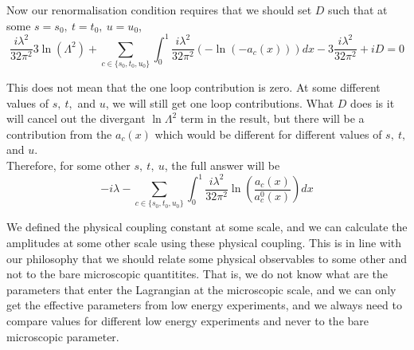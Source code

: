 \documentclass[11pt, notitlepage]{report}
\numberwithin{equation}{section}
\begin{document}
Now our renormalisation condition requires that we should set \(D\) such that at some \(s=s_0,~t=t_0,~u=u_0\), 
\begin{equation*}
    \frac{i\lambda^2 }{32\pi^2} 3\ln(\Lambda^2) +  \sum_{c\in\{s_0,t_0,u_0\}} \int_0^1  \frac{i\lambda^2 }{32\pi^2} \left( - \ln (-a_c(x)) \right)dx -  3\frac{i\lambda^2 }{32\pi^2} + iD = 0
\end{equation*}

This does not mean that the one loop contribution is zero. At some different values of \(s,~t,\) and \(u\), we will still get one loop contributions. What \(D\) does is it will cancel out the divergant \(\ln\Lambda^2\) term in the result, but there will be a contribution from the \(a_c(x)\) which would be different for different values of \(s,~t,\) and \(u\).\\

Therefore, for some other \(s,~t,~u\), the full answer will be 
\begin{equation*}
    -i\lambda - \sum_{c\in\{s_0,t_0,u_0\}} \int_0^1  \frac{i\lambda^2 }{32\pi^2}  \ln \left(\frac{a_c(x)}{a_c^0(x)} \right)dx
\end{equation*}

We defined the physical coupling constant at some scale, and we can calculate the amplitudes at some other scale using these physical coupling. This is in line with our philosophy that we should relate some physical observables to some other and not to the bare microscopic quantitites. That is, we do not know what are the parameters that enter the Lagrangian at the microscopic scale, and we can only get the effective parameters from low energy experiments, and we always need to compare values for different low energy experiments and never to the bare microscopic parameter.
\end{document}
